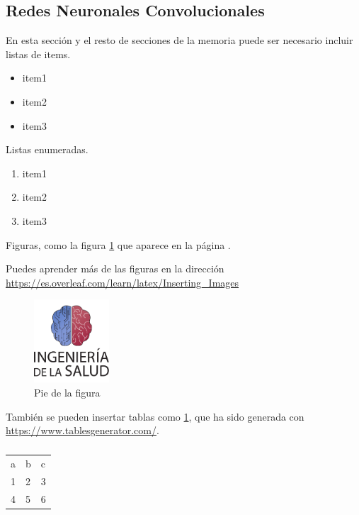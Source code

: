 \subsection{Redes Neuronales Convolucionales}

En esta sección y el resto de secciones de la memoria puede ser necesario incluir listas de items.

\begin{itemize}
    \item item1
    \item item2
    \item item3
\end{itemize}

Listas enumeradas.

\begin{enumerate}
    \item item1
    \item item2
    \item item3
\end{enumerate}

Figuras, como la figura \ref{fig:escudo} que aparece en la página \pageref{fig:escudo}. 

Puedes aprender más de las figuras en la dirección \url{https://es.overleaf.com/learn/latex/Inserting_Images}

\begin{figure}[h]
    \centering
    \includegraphics[width=0.25\textwidth]{img/escudoSalud.pdf}
    \caption{Pie de la figura}
    \label{fig:escudo}
\end{figure}


También se pueden insertar tablas como \ref{tab:my-table}, que ha sido generada con \url{https://www.tablesgenerator.com/}.

\begin{table}[]
\begin{tabular}{lll}
a & b & c \\
1 & 2 & 3 \\
4 & 5 & 6
\end{tabular}
\caption{}
\label{tab:my-table}
\end{table}

